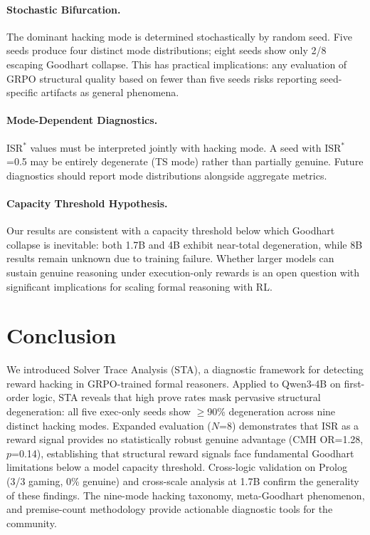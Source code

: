 \documentclass[11pt,a4paper]{article}
\newcommand{\isr}{\textsc{ISR}}
\newcommand{\sta}{\textsc{STA}}
\newcommand{\grpo}{\textsc{GRPO}}
\begin{document}
\paragraph{Stochastic Bifurcation.}
The dominant hacking mode is determined stochastically by random seed.
Five seeds produce four distinct mode distributions; eight seeds show only 2/8 escaping Goodhart collapse.
This has practical implications: any evaluation of \grpo{} structural quality based on fewer than five seeds risks reporting seed-specific artifacts as general phenomena.

\paragraph{Mode-Dependent Diagnostics.}
\isr{}$^*$ values must be interpreted jointly with hacking mode.
A seed with \isr{}$^*$=0.5 may be entirely degenerate (TS mode) rather than partially genuine.
Future diagnostics should report mode distributions alongside aggregate metrics.

\paragraph{Capacity Threshold Hypothesis.}
Our results are consistent with a capacity threshold below which Goodhart collapse is inevitable: both 1.7B and 4B exhibit near-total degeneration, while 8B results remain unknown due to training failure.
Whether larger models can sustain genuine reasoning under execution-only rewards is an open question with significant implications for scaling formal reasoning with RL.

\section{Conclusion}

We introduced Solver Trace Analysis (\sta{}), a diagnostic framework for detecting reward hacking in \grpo{}-trained formal reasoners.
Applied to Qwen3-4B on first-order logic, \sta{} reveals that high prove rates mask pervasive structural degeneration: all five exec-only seeds show $\geq$90\% degeneration across nine distinct hacking modes.
Expanded evaluation ($N$=8) demonstrates that \isr{} as a reward signal provides no statistically robust genuine advantage (CMH OR=1.28, $p$=0.14), establishing that structural reward signals face fundamental Goodhart limitations below a model capacity threshold.
Cross-logic validation on Prolog (3/3 gaming, 0\% genuine) and cross-scale analysis at 1.7B confirm the generality of these findings.
The nine-mode hacking taxonomy, meta-Goodhart phenomenon, and premise-count methodology provide actionable diagnostic tools for the community.
\end{document}
